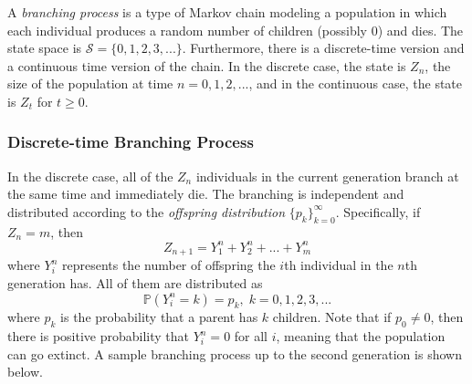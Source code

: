 \documentclass{article}
\begin{document}
    \begin{definition}
      A \textit{branching process} is a type of Markov chain modeling a population in which each individual produces a random number of children (possibly $0$) and dies. The state space is $\mathcal{S} = \{0, 1, 2, 3, ...\}$. Furthermore, there is a discrete-time version and a continuous time version of the chain. In the discrete case, the state is $Z_n$, the size of the population at time $n = 0, 1, 2, ...$, and in the continuous case, the state is $Z_t$ for $t \geq 0$. 
    \end{definition}

    \subsubsection{Discrete-time Branching Process}

      In the discrete case, all of the $Z_n$ individuals in the current generation branch at the same time and immediately die. The branching is independent and distributed according to the \textit{offspring distribution} $\{p_k\}_{k=0}^\infty$. Specifically, if $Z_n = m$, then 
      \begin{equation}
        Z_{n+1} = Y_1^n + Y_2^n + ... + Y_m^n
      \end{equation}
      where $Y_i^n$ represents the number of offspring the $i$th individual in the $n$th generation has. All of them are distributed as
      \begin{equation}
        \mathbb{P}(Y_i^n = k) = p_k, \; k = 0, 1, 2, 3, ...
      \end{equation}
      where $p_k$ is the probability that a parent has $k$ children. Note that if $p_0 \neq 0$, then there is positive probability that $Y_i^n = 0$ for all $i$, meaning that the population can go extinct. A sample branching process up to the second generation is shown below. 

      \begin{center}
      \end{center}
\end{document}

